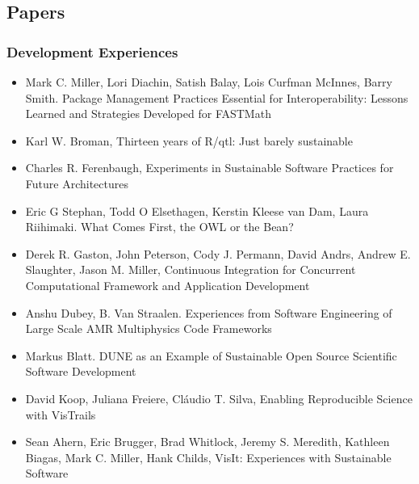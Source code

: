 \documentclass[11pt, oneside]{amsart}
\begin{document}
\subsection*{Papers}

\subsubsection*{Development Experiences}

\begin{itemize}

\item Mark C. Miller, Lori Diachin, Satish Balay, Lois Curfman
  McInnes, Barry Smith. Package Management Practices Essential for
  Interoperability: Lessons Learned and Strategies Developed for
  FASTMath~\cite{Miller_WSSSPE}

\item Karl W. Broman, Thirteen years of R/qtl: Just barely sustainable~\cite{Broman_WSSSPE}

\item Charles R. Ferenbaugh, Experiments in Sustainable Software
  Practices for Future Architectures~\cite{Ferenbaugh_WSSSPE}

\item Eric G Stephan, Todd O Elsethagen, Kerstin Kleese van Dam, Laura
  Riihimaki. What Comes First, the OWL or the Bean?~\cite{Stephan_WSSSPE}

\item Derek R. Gaston, John Peterson, Cody J. Permann, David Andrs,
  Andrew E. Slaughter, Jason M. Miller, Continuous Integration for
  Concurrent Computational Framework and Application Development~\cite{Gaston_WSSSPE}

\item Anshu Dubey, B. Van Straalen. Experiences from Software
  Engineering of Large Scale AMR Multiphysics Code Frameworks~\cite{Dubey_WSSSPE}

\item Markus Blatt. DUNE as an Example of Sustainable Open Source
  Scientific Software Development~\cite{Blatt_WSSSPE}

\item David Koop, Juliana Freiere, Cl\'{a}udio T. Silva, Enabling
  Reproducible Science with VisTrails~\cite{Koop_WSSSPE}

\item Sean Ahern, Eric Brugger, Brad Whitlock, Jeremy S. Meredith,
  Kathleen Biagas, Mark C. Miller, Hank Childs, VisIt: Experiences
  with Sustainable Software~\cite{Ahern_WSSSPE}


\end{itemize}
\end{document}
